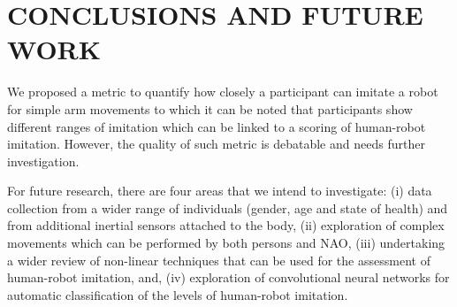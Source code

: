 \documentclass{sig-alternate-05-2015}
\begin{document}
\section{CONCLUSIONS AND FUTURE WORK}
We proposed a metric to quantify how closely a participant can imitate a robot for simple arm
movements to which it can be noted
that participants show different ranges 
of imitation which can be linked to a scoring of human-robot imitation.
However, the quality of such metric is debatable and needs further investigation.

For future research, there are four areas that we intend to investigate:
(i) data collection from a wider range of individuals (gender, age and state of health)
and from additional inertial sensors attached to the body,
(ii) exploration of complex movements which can be performed by both persons and NAO,
(iii) undertaking a wider review of non-linear techniques that can be used for 
the assessment of human-robot imitation, and, 
(iv) exploration of convolutional neural networks for automatic 
classification of the levels of human-robot imitation.



 
\end{document}
